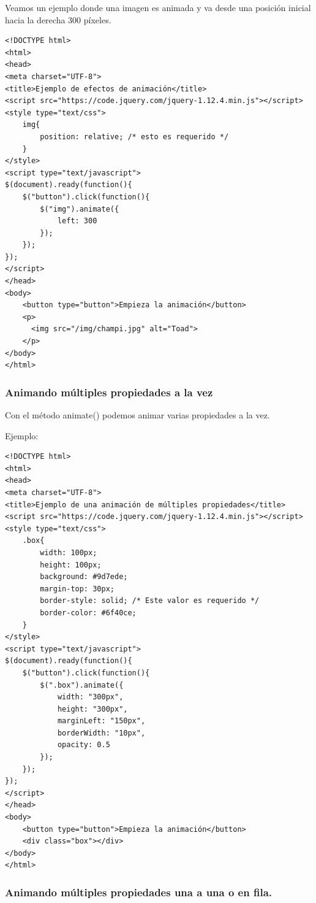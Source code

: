 \documentclass[11pt]{article}
\begin{document}
Veamos un ejemplo donde una imagen es animada y va desde una posición inicial hacia la derecha 300 píxeles.

\begin{verbatim}
<!DOCTYPE html>
<html>
<head>
<meta charset="UTF-8">
<title>Ejemplo de efectos de animación</title>
<script src="https://code.jquery.com/jquery-1.12.4.min.js"></script>
<style type="text/css">
    img{
        position: relative; /* esto es requerido */
    }
</style>
<script type="text/javascript">
$(document).ready(function(){
    $("button").click(function(){
        $("img").animate({
            left: 300
        });
    });
});
</script>
</head>
<body>
    <button type="button">Empieza la animación</button>
    <p>
      <img src="/img/champi.jpg" alt="Toad">
    </p>
</body>
</html>                                		
\end{verbatim}

\subsubsection*{Animando múltiples propiedades a la vez}
\label{sec:org6e73c75}

Con el método animate() podemos animar varias propiedades a la vez.

Ejemplo:

\begin{verbatim}
<!DOCTYPE html>
<html>
<head>
<meta charset="UTF-8">
<title>Ejemplo de una animación de múltiples propiedades</title>
<script src="https://code.jquery.com/jquery-1.12.4.min.js"></script>
<style type="text/css">
    .box{
        width: 100px;
        height: 100px;
        background: #9d7ede;
        margin-top: 30px;
        border-style: solid; /* Este valor es requerido */
        border-color: #6f40ce;
    }
</style>
<script type="text/javascript">
$(document).ready(function(){
    $("button").click(function(){
        $(".box").animate({
            width: "300px",
            height: "300px",
            marginLeft: "150px",
            borderWidth: "10px",
            opacity: 0.5
        });
    });
});
</script>
</head>
<body>
    <button type="button">Empieza la animación</button>
    <div class="box"></div>
</body>
</html>                                		
\end{verbatim}

\subsubsection*{Animando múltiples propiedades una a una o en fila.}
\label{sec:org6914f1c}
\end{document}
